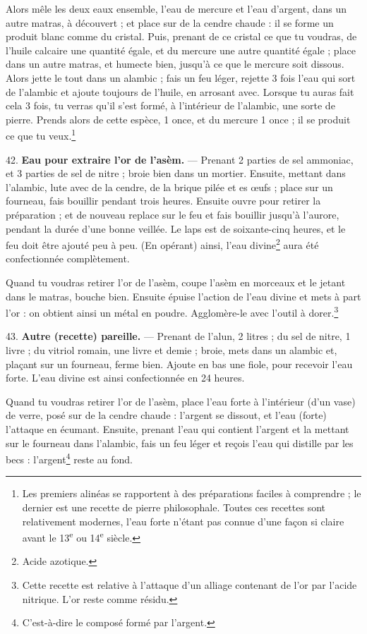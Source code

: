 \documentclass[a4paper, 11pt, oneside, polutonikogreek, french]{article}
\begin{document}
Alors mêle les deux eaux ensemble, l'eau de mercure et l'eau d'argent, dans un autre matras, à découvert ; et place sur de la cendre chaude : il se forme un produit blanc comme du cristal. Puis, prenant de ce cristal ce que tu voudras, de l'huile calcaire une quantité égale, et du mercure une autre quantité égale ; place dans un autre matras, et humecte bien, jusqu'à ce que le mercure soit dissous. Alors jette le tout dans un alambic ; fais un feu léger, rejette 3 fois l'eau qui sort de l'alambic et ajoute toujours de l'huile, en arrosant avec. Lorsque tu auras fait cela 3 fois, tu verras qu'il s'est formé, à l'intérieur de l'alambic, une sorte de pierre. Prends alors de cette espèce, 1 once, et du mercure 1 once ; il se produit ce que tu veux.\footnote{Les premiers alinéas se rapportent à des préparations faciles à comprendre ; le dernier est une recette de pierre philosophale. Toutes ces recettes sont relativement modernes, l'eau forte n'étant pas connue d'une façon si claire avant le 13\textsuperscript{e} ou 14\textsuperscript{e} siècle.}

42. \textbf{Eau pour extraire l'or de l'asèm.} --- Prenant 2 parties de sel ammoniac, et 3 parties de sel de nitre ; broie bien dans un mortier. Ensuite, mettant dans l'alambic, lute avec de la cendre, de la brique pilée et es œufs ; place sur un fourneau, fais bouillir pendant trois heures. Ensuite ouvre pour retirer la préparation ; et de nouveau replace sur le feu et fais bouillir jusqu'à l'aurore, pendant la durée d'une bonne veillée. Le laps est de soixante-cinq heures, et le feu doit être ajouté peu à peu. (En opérant) ainsi, l'eau divine\footnote{Acide azotique.} aura été confectionnée complètement.

Quand tu voudras retirer l'or de l'asèm, coupe l'asèm en morceaux et le jetant dans le matras, bouche bien. Ensuite épuise l'action de l'eau divine et mets à part l'or : on obtient ainsi un métal en poudre. Agglomère-le avec l'outil à dorer.\footnote{Cette recette est relative à l'attaque d'un alliage contenant de l'or par l'acide nitrique. L'or reste comme résidu.}

43. \textbf{Autre (recette) pareille.} --- Prenant de l'alun, 2 litres ; du sel de nitre, 1 livre ; du vitriol romain, une livre et demie ; broie, mets dans un alambic et, plaçant sur un fourneau, ferme bien. Ajoute en bas une fiole, pour recevoir l'eau forte. L'eau divine est ainsi confectionnée en 24 heures.

Quand tu voudras retirer l'or de l'asèm, place l'eau forte à l'intérieur (d'un vase) de verre, posé sur de la cendre chaude : l'argent se dissout, et l'eau (forte) l'attaque en écumant. Ensuite, prenant l'eau qui contient l'argent et la mettant sur le fourneau dans l'alambic, fais un feu léger et reçois l'eau qui distille par les becs : l'argent\footnote{C'est-à-dire le composé formé par l'argent.} reste au fond.
\end{document}
